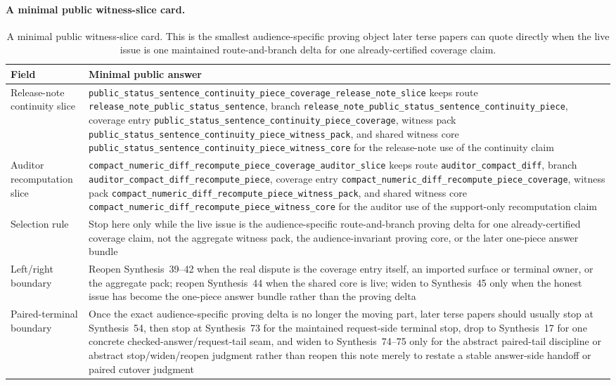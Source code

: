 \documentclass[11pt]{article}
\begin{document}
\paragraph{A minimal public witness-slice card.}
\begin{table}[t]
\centering
\small
\begin{tabularx}{\linewidth}{@{}LY@{}}
\toprule
Field & Minimal public answer \\
\midrule
Release-note continuity slice & \nolinkurl{public_status_sentence_continuity_piece_coverage_release_note_slice} keeps route \nolinkurl{release_note_public_status_sentence}, branch \nolinkurl{release_note_public_status_sentence_continuity_piece}, coverage entry \nolinkurl{public_status_sentence_continuity_piece_coverage}, witness pack \nolinkurl{public_status_sentence_continuity_piece_witness_pack}, and shared witness core \nolinkurl{public_status_sentence_continuity_piece_witness_core} for the release-note use of the continuity claim \\
Auditor recomputation slice & \nolinkurl{compact_numeric_diff_recompute_piece_coverage_auditor_slice} keeps route \nolinkurl{auditor_compact_diff}, branch \nolinkurl{auditor_compact_diff_recompute_piece}, coverage entry \nolinkurl{compact_numeric_diff_recompute_piece_coverage}, witness pack \nolinkurl{compact_numeric_diff_recompute_piece_witness_pack}, and shared witness core \nolinkurl{compact_numeric_diff_recompute_piece_witness_core} for the auditor use of the support-only recomputation claim \\
Selection rule & Stop here only while the live issue is the audience-specific route-and-branch proving delta for one already-certified coverage claim, not the aggregate witness pack, the audience-invariant proving core, or the later one-piece answer bundle \\
Left/right boundary & Reopen Synthesis~39--42 when the real dispute is the coverage entry itself, an imported surface or terminal owner, or the aggregate pack; reopen Synthesis~44 when the shared core is live; widen to Synthesis~45 only when the honest issue has become the one-piece answer bundle rather than the proving delta \\
Paired-terminal boundary & Once the exact audience-specific proving delta is no longer the moving part, later terse papers should usually stop at Synthesis~54, then stop at Synthesis~73 for the maintained request-side terminal stop, drop to Synthesis~17 for one concrete checked-answer/request-tail seam, and widen to Synthesis~74--75 only for the abstract paired-tail discipline or abstract stop/widen/reopen judgment rather than reopen this note merely to restate a stable answer-side handoff or paired cutover judgment \\
\bottomrule
\end{tabularx}
\caption{A minimal public witness-slice card. This is the smallest audience-specific proving object later terse papers can quote directly when the live issue is one maintained route-and-branch delta for one already-certified coverage claim.}
\label{tab:minimal-public-witness-slice-card}
\end{table}
\end{document}
